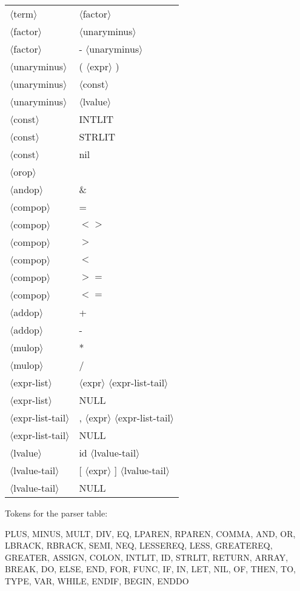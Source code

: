 \documentclass[11pt, fleqn]{article}
\newcommand{\atag}[1]{$\langle$#1$\rangle$}
\begin{document}
\begin{longtable}{l|l}
\atag{term}						&	\atag{factor}		\\
\atag{factor}					&	\atag{unaryminus}		\\
\atag{factor}					&	- \atag{unaryminus}		\\
\atag{unaryminus}				&	( \atag{expr} )		\\
\atag{unaryminus}				&	\atag{const}		\\
\atag{unaryminus}				&	\atag{lvalue}		\\
\atag{const}						&	INTLIT		\\
\atag{const}						&	STRLIT		\\
\atag{const}						&	nil		\\
\atag{orop} 						&	\textbar		\\
\atag{andop}						&	\&		\\
\atag{compop}					&	=		\\
\atag{compop}					&	$<>$		\\
\atag{compop}					&	$>$		\\
\atag{compop}					&	$<$		\\
\atag{compop}					&	$>=$		\\
\atag{compop}					&	$<=$		\\
\atag{addop}						&	+		\\
\atag{addop}						&	-		\\
\atag{mulop}						&	*		\\
\atag{mulop}						&	/		\\
\atag{expr-list}					&	\atag{expr} \atag{expr-list-tail}		\\
\atag{expr-list}					&	NULL		\\
\atag{expr-list-tail}			&	, \atag{expr} \atag{expr-list-tail}		\\
\atag{expr-list-tail}			&	NULL		\\
\atag{lvalue}					&	id \atag{lvalue-tail}		\\
\atag{lvalue-tail}				&	[ \atag{expr} ] \atag{lvalue-tail}		\\
\atag{lvalue-tail}				&	NULL		\\
\end{longtable}


Tokens for the parser table:

PLUS, MINUS, MULT, DIV, EQ, LPAREN, RPAREN, COMMA, AND, OR, LBRACK, RBRACK, SEMI, NEQ, LESSEREQ, LESS, GREATEREQ, GREATER, ASSIGN, COLON, INTLIT, ID, STRLIT, RETURN, ARRAY, BREAK, DO, ELSE, END, FOR, FUNC, IF, IN, LET, NIL, OF, THEN, TO, TYPE, VAR, WHILE, ENDIF, BEGIN, ENDDO
\end{document}
